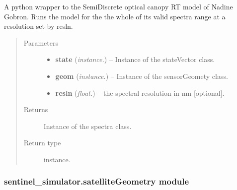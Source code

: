 \documentclass[letterpaper,10pt,english]{sphinxmanual}
\begin{document}
\begin{fulllineitems}
\label{source/sentinel_simulator:sentinel_simulator.opticalCanopyRT.canopyRTOptical}
A python wrapper to the SemiDiscrete optical
canopy RT model of Nadine Gobron. Runs the
model for the the whole of its valid spectra
range at a resolution set by resln.
\begin{quote}\begin{description}
\item[{Parameters}] \leavevmode\begin{itemize}
\item {} 
\textbf{state} (\emph{instance.}) -- Instance of the stateVector class.

\item {} 
\textbf{geom} (\emph{instance.}) -- Instance of the sensorGeomety class.

\item {} 
\textbf{resln} (\emph{float.}) -- the spectral resolution in nm {[}optional{]}.

\end{itemize}

\item[{Returns}] \leavevmode
Instance of the spectra class.

\item[{Return type}] \leavevmode
instance.

\end{description}\end{quote}

\end{fulllineitems}



\subsubsection{sentinel\_simulator.satelliteGeometry module}
\label{source/sentinel_simulator:module-sentinel_simulator.satelliteGeometry}\label{source/sentinel_simulator:sentinel-simulator-satellitegeometry-module}
\end{document}
